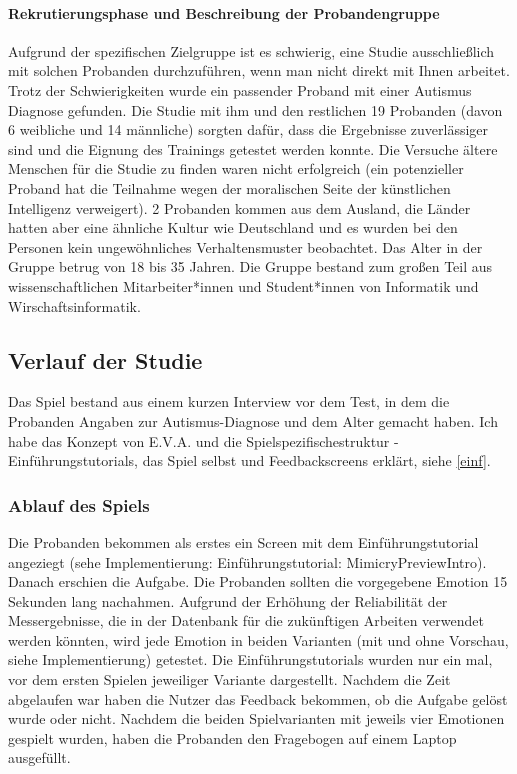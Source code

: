 \paragraph{Rekrutierungsphase und Beschreibung der Probandengruppe}  Aufgrund der spezifischen Zielgruppe ist es schwierig, eine Studie ausschließlich mit solchen Probanden durchzuführen, wenn man nicht direkt mit Ihnen arbeitet. Trotz der Schwierigkeiten wurde ein passender Proband mit einer Autismus Diagnose gefunden. Die Studie mit ihm und den restlichen 19 Probanden (davon 6 weibliche und 14 männliche) sorgten dafür, dass die Ergebnisse zuverlässiger sind und die Eignung des Trainings getestet werden konnte. Die Versuche ältere Menschen für die Studie zu finden waren nicht erfolgreich (ein potenzieller Proband hat die Teilnahme wegen der moralischen Seite der künstlichen Intelligenz verweigert). 2 Probanden kommen aus dem Ausland, die Länder hatten aber eine ähnliche Kultur wie Deutschland und es wurden bei den Personen kein ungewöhnliches Verhaltensmuster beobachtet. Das Alter in der Gruppe betrug von 18 bis 35 Jahren. Die Gruppe bestand zum großen Teil aus wissenschaftlichen Mitarbeiter*innen und Student*innen von Informatik und Wirschaftsinformatik.

\subsection{Verlauf der Studie}
Das Spiel bestand aus einem kurzen Interview vor dem Test, in dem die Probanden Angaben zur Autismus-Diagnose und dem Alter gemacht haben. Ich habe das Konzept von E.V.A. und die Spielspezifischestruktur - Einführungstutorials, das Spiel selbst und Feedbackscreens erklärt, siehe \ref{einf}.

\subsubsection{Ablauf des Spiels}Die Probanden bekommen als erstes ein Screen mit dem Einführungstutorial angeziegt (sehe Implementierung: Einführungstutorial: MimicryPreviewIntro). Danach erschien die Aufgabe. Die Probanden sollten die vorgegebene Emotion 15 Sekunden lang nachahmen. Aufgrund der Erhöhung der Reliabilität der Messergebnisse, die in der Datenbank für die zukünftigen Arbeiten verwendet werden könnten, wird jede Emotion in beiden Varianten (mit und ohne Vorschau, siehe Implementierung) getestet. Die Einführungstutorials wurden nur ein mal, vor dem ersten Spielen jeweiliger Variante dargestellt. Nachdem die Zeit abgelaufen war haben die Nutzer das Feedback bekommen, ob die Aufgabe gelöst wurde oder nicht. Nachdem die beiden Spielvarianten mit jeweils vier Emotionen gespielt wurden, haben die Probanden den Fragebogen auf einem Laptop ausgefüllt.

